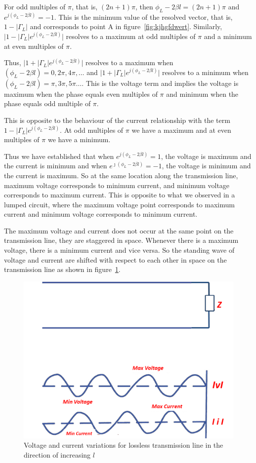 For odd multiples of $\pi$, that is, $(2n + 1)\pi$, then $\phi_L - 2 \beta l=(2 n + 1)\pi$ and $e^{j (\phi_L - 2 \beta l)} = -1$. This is the minimum value of the resolved vector, that is, $1 - \lvert\Gamma_L\rvert$ and corresponds to point A in figure~\ref{fig:kjhgfdwert}. Similarly, $\lvert 1 - \lvert\Gamma_L\rvert e^{j (\phi_L - 2\beta l)}\rvert$ resolves to a maximum at odd multiples of $\pi$ and a minimum at even multiples of $\pi$.

Thus, $\lvert 1 + \lvert\Gamma_L\rvert e^{j (\phi_L - 2\beta l)}\rvert$ resolves to a maximum when $(\phi_L - 2\beta l) = 0, 2\pi, 4\pi, \ldots$ and $\lvert 1 + \lvert\Gamma_L\rvert e^{j (\phi_L - 2\beta l)}\rvert$ resolves to a minimum when $(\phi_L -2\beta l) = \pi, 3\pi, 5\pi \ldots$. This is the voltage term and implies the voltage is maximum when the phase equals even multiples of $\pi$ and minimum when the phase equals odd multiple of $\pi$.

This is opposite to the behaviour of the current relationship with the term $1-|\Gamma_L| e^{j(\phi_L -2\beta l)}$. At odd multiples of $\pi$ we have a maximum and at even multiples of $\pi$ we have a minimum.

Thus we have established that when $ e^{j(\phi_L - 2 \beta l)} = 1$, the voltage is maximum and the current is minimum and when $ e^{\jmath(\phi_L - 2 \beta l)} = -1$, the voltage is minimum and the current is maximum. So at the same location along the transmission line, maximum voltage corresponds to minimum current, and minimum voltage corresponds to maximum current. This is opposite to what we observed in a lumped circuit, where the maximum voltage point corresponds to maximum current and minimum voltage corresponds to minimum current.

The maximum voltage and current does not occur at the same point on the transmission line, they are staggered in space. Whenever there is a maximum voltage, there is a minimum current and vice versa. So the standing wave of voltage and current are shifted with respect to each other in space on the transmission line as shown in figure~\ref{fig:asdfghjhgfdsa}. 
\begin{figure}[h]
\centering
\includegraphics[width=0.7\linewidth]{./graphics/fig5.4modified}
\caption{Voltage and current variations for lossless transmission line in the direction of increasing $l$}
\label{fig:asdfghjhgfdsa}
\end{figure}

